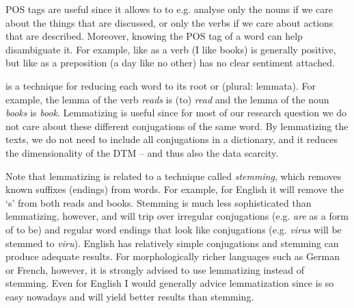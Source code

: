 POS tags are useful since it allows to to e.g. analyse only the nouns if we care about the things that are discussed, or only the verbs if we care about actions that are described.
Moreover, knowing the POS tag of a word can help disambiguate it.
For example, like as a verb (I like books) is generally positive, but like as a preposition (a day like no other) has no clear sentiment attached.

 is a technique for reducing each word to its root or  (plural: lemmata).
For example, the lemma of the verb \emph{reads} is (to) \emph{read} and the lemma of the noun \emph{books} is \emph{book}.
Lemmatizing is useful since for most of our research question we do not care about these different conjugations of the same word.
By lemmatizing the texts, we do not need to include all conjugations in a dictionary,
and it reduces the dimensionality of the DTM -- and thus also the data scarcity.

Note that lemmatizing is related to a technique called \emph{stemming}, which removes known suffixes (endings) from words.
For example, for English it will remove the `s' from both reads and books.
Stemming is much less sophisticated than lemmatizing, however, and will trip over irregular conjugations
(e.g. \emph{are} as a form of to be) and regular word endings that look like conjugations (e.g. \emph{virus} will be stemmed to \emph{viru}).
English has relatively simple conjugations and stemming can produce adequate results.
For morphologically richer languages such as German or French, however, it is strongly advised to use lemmatizing instead of stemming.
Even for English I would generally advice lemmatization since is so easy nowadays and will yield better results than stemming.

